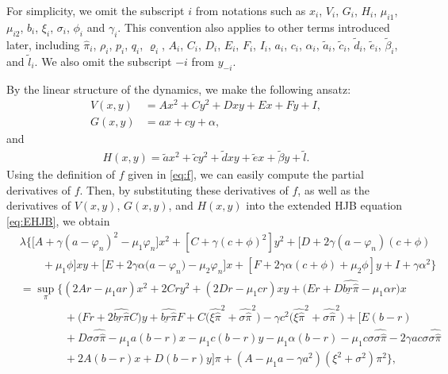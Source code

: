 \documentclass[11pt]{article}
\numberwithin{equation}{section}
\providecommand{\smn}{{-}} %
\begin{document}
	For simplicity, we omit the subscript \(i\) from notations such as \(x_i\), \(V_i\), \(G_i\), \(H_i\), \(\mu_{i1}\), \(\mu_{i2}\), \(b_i\), \(\xi_i\), \(\sigma_i\), \(\phi_i\) and \(\gamma_i\). This convention also applies to other terms introduced later, including \(\widehat{\pi}_i\), \(\rho_i\), \(p_i\), \(q_i\), \(\varrho_i\), \(A_i\), \(C_i\), \(D_i\), \(E_i\), \(F_i\), \(I_i\), \(a_i\), \(c_i\), \(\alpha_i\), \( \tilde{a}_i\), \( \tilde{c}_i\), \( \tilde{d}_i\), \( \tilde{e}_i\), \( \tilde{\beta}_i\), and \( \tilde{l}_i\). We also omit the subscript \(\smn i\) from \(y_{\smn i}\).
	
	By the linear structure of the dynamics, we make the following ansatz:
	\begin{align}
		V(x,y)&=A x^2+C y^2+D xy+E x+F y+I ,
		\label{eq:W}\\
		G(x,y)&=a x+c y+\alpha ,
		\label{eq:G}
	\end{align}
	and
	\begin{align}
		H(x,y)= \tilde{a} x^2+ \tilde{c} y^2+ \tilde{d} xy+ \tilde{e} x+ \tilde{\beta} y+ \tilde{l}.
		\label{eq:H}
	\end{align}
	Using the definition of \(f\) given in \eqref{eq:f}, we can easily compute the partial derivatives of \(f\). Then, by substituting these derivatives of \(f\), as well as the derivatives of \(V(x,y)\), \(G(x,y)\), and \(H(x,y)\) into the extended HJB equation \eqref{eq:EHJB}, we obtain
	\begin{align}
		&\lambda\bigg\{\Big[A+\gamma(a-{\varphi}_{n})^2-\mu_1 {\varphi}_{n}\Big]x^2+[C+\gamma(c+\phi)^2]y^2+\Big[D+2\gamma(a-{\varphi}_{n})(c+\phi)\\
		&\quad\quad+\mu_1{\phi}\Big]xy+\Big[E+2\gamma \alpha\Big(a-{\varphi}_{n}\Big)-\mu_2{\varphi}_{n}\Big]x+[F+2\gamma \alpha(c+\phi)+\mu_2\phi]y+I  +\gamma \alpha^2  \bigg\}\\
		&=\sup_{{\pi}}\Big\{ 	(2Ar-\mu_1ar)x^2+2Cry^2+(2Dr-\mu_1cr)xy+\big(Er+D\widehat{\underline{br}\widehat{\pi}}-\mu_1\alpha r\big)x\\
		&\quad\quad\quad\quad+\big(Fr+2\widehat{\underline{br}\widehat{\pi}}C\big)y+\widehat{\underline{br}\widehat{\pi}}F +C\Big(\widehat{\xi\widehat{\pi}}^2+\widehat{\sigma\widehat{\pi}}^2\Big)-\gamma c^2\Big(\widehat{\xi\widehat{\pi}}^2+\widehat{\sigma\widehat{\pi}}^2\Big)+\Big[E(b-r)\\	&\quad\quad\quad\quad+D\sigma\widehat{\sigma\widehat{\pi}}-\mu_1a(b-r)x
	-\mu_1c(b-r)y-\mu_1\alpha(b-r)-\mu_1c\sigma\widehat{\sigma\widehat{\pi}}-2\gamma ac\sigma\widehat{\sigma\widehat{\pi}}\\
	&\quad\quad\quad\quad+2A(b-r)x+D(b-r)y\Big]\pi +(A-\mu_1a-\gamma a^2)(\xi^2+\sigma^2)\pi^2\Big\},	\label{eq:SEHJB2}
	\end{align}		
\end{document}
